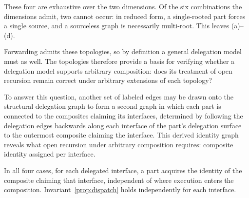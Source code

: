 \documentclass[acmsmall,screen,review,anonymous]{acmart}
\theoremstyle{acmplain}
\begin{document}
These four are exhaustive over the two dimensions. Of the six combinations the dimensions admit, two cannot occur: in reduced
form, a single-rooted part forces a single source, and a sourceless graph is necessarily multi-root. This leaves (a)–(d).

Forwarding admits these topologies, so by definition a general delegation model must as well. The topologies therefore provide
a basis for verifying whether a delegation model supports arbitrary composition: does its treatment of open recursion remain
correct under arbitrary extensions of each topology?

To answer this question, another set of labeled edges may be drawn onto the structural delegation graph to form a second graph in which each part
is connected to the composites claiming its interfaces, determined by following the delegation edges backwards along each
interface of the part's delegation surface to the outermost composite claiming the interface. This derived identity graph
reveals what open recursion under arbitrary composition requires: composite identity assigned per interface.

In all four cases, for each delegated interface, a part acquires the identity of the composite claiming that interface,
independent of where execution enters the composition. Invariant~\ref{prop:dispatch} holds independently for each interface.
\end{document}
